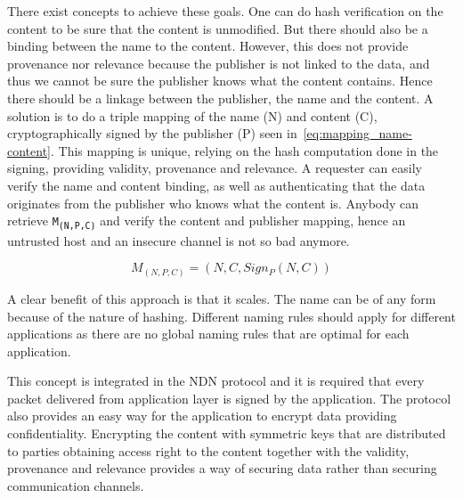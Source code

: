 There exist concepts to achieve these goals.
One can do hash verification on the content to be sure that the content is unmodified. 
But there should also be a binding between the \gls{name} to the content.
However, this does not provide provenance nor relevance because the \gls{publisher} is not linked to the data, and thus we cannot be sure the \gls{publisher} knows what the content contains.
Hence there should be a linkage between the \gls{publisher}, the \gls{name} and the content.
A solution is to do a triple mapping of the \gls{name} (N) and content (C), cryptographically signed by the \gls{publisher} (P) seen in~\autoref{eq:mapping_name-content}.
This mapping is unique, relying on the hash computation done in the signing, providing validity, provenance and relevance.
A requester can easily verify the \gls{name} and content binding, as well as authenticating that the data originates from the \gls{publisher} who knows what the content is.
Anybody can retrieve \texttt{M\textsubscript{(N,P,C)}} and verify the content and publisher mapping, hence an untrusted \gls{host} and an insecure channel is not so bad anymore.

\begin{equation}\label{eq:mapping_name-content}
M_{(N, P, C)} = (N,C,Sign_{P}(N,C))
\end{equation}

A clear benefit of this approach is that it scales. 
The \gls{name} can be of any form because of the nature of hashing. 
Different naming rules should apply for different applications as there are no global naming rules that are optimal for each application.

This concept is integrated in the \gls{NDN} protocol and it is required that every packet delivered from application layer is signed by the application.
The protocol also provides an easy way for the application to encrypt data providing confidentiality.
Encrypting the content with symmetric keys that are distributed to parties obtaining access right to the content together with the validity, provenance and relevance provides a way of securing data rather than securing communication channels.

